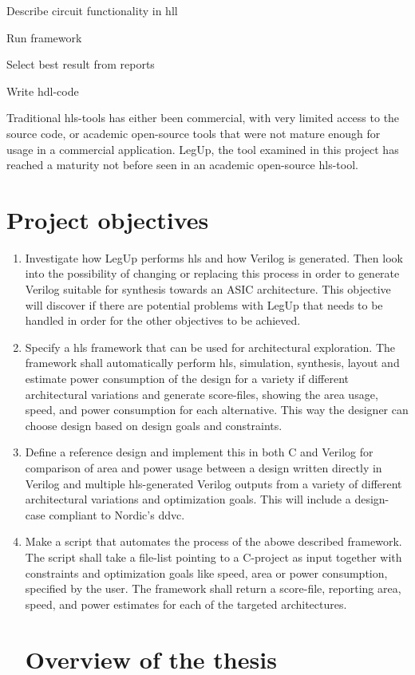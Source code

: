 \begin{compactenum}
    \item Describe circuit functionality in \gls{hll}
    \item Run framework
    \item Select best result from reports
    \item Write \gls{hdl}-code
\end{compactenum}
Traditional \gls{hls}-tools has either been commercial, with very limited access to the source code, or academic open-source tools that were not mature enough for usage in a commercial application. LegUp, the tool examined in this project has reached a maturity not before seen in an academic open-source \gls{hls}-tool.
\section{Project objectives}
\begin{enumerate}
    \item Investigate how LegUp performs \gls{hls} and how Verilog is generated. Then look into the possibility of changing or replacing this process in order to generate Verilog suitable for synthesis towards an ASIC architecture. This objective will discover if there are potential problems with LegUp that needs to be handled in order for the other objectives to be achieved.
    \item Specify a \gls{hls} framework that can be used for architectural exploration. The framework shall automatically perform \gls{hls}, simulation, synthesis, layout and estimate power consumption of the design for a variety if different architectural variations and generate score-files, showing the area usage, speed, and power consumption for each alternative. This way the designer can choose design based on design goals and constraints.
    \item Define a reference design and implement this in both C and Verilog for comparison of area and power usage between a design written directly in Verilog and multiple \gls{hls}-generated Verilog outputs from a variety of different architectural variations and optimization goals. This will include a design-case compliant to Nordic’s \gls{ddvc}.
    \item Make a script that automates the process of the abowe described framework. The script shall take a file-list pointing to a C-project as input together with constraints and optimization goals like speed, area or power consumption, specified by the user. The framework shall return a score-file, reporting area, speed, and power estimates for each of the targeted architectures.
\section{Overview of the thesis}

\end{enumerate}